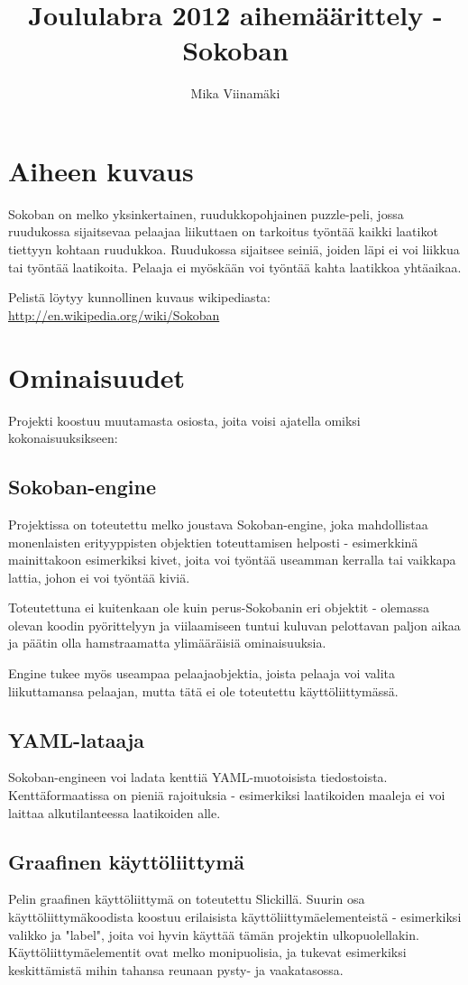 \documentclass{article}
\begin{document}
\title{Joululabra 2012 aihemäärittely - Sokoban}
\author{Mika Viinamäki}
\maketitle

\section*{Aiheen kuvaus}
Sokoban on melko yksinkertainen, ruudukkopohjainen puzzle-peli, jossa ruudukossa sijaitsevaa pelaajaa liikuttaen on tarkoitus työntää kaikki laatikot tiettyyn kohtaan ruudukkoa. Ruudukossa sijaitsee seiniä, joiden läpi ei voi liikkua tai työntää laatikoita. Pelaaja ei myöskään voi työntää kahta laatikkoa yhtäaikaa.
    
Pelistä löytyy kunnollinen kuvaus wikipediasta: \url{http://en.wikipedia.org/wiki/Sokoban}
    
\section*{Ominaisuudet}
Projekti koostuu muutamasta osiosta, joita voisi ajatella omiksi kokonaisuuksikseen:

\subsection*{Sokoban-engine}
Projektissa on toteutettu melko joustava Sokoban-engine, joka mahdollistaa monenlaisten erityyppisten objektien toteuttamisen helposti - esimerkkinä mainittakoon esimerkiksi kivet, joita voi työntää useamman kerralla tai vaikkapa lattia, johon ei voi työntää kiviä.

Toteutettuna ei kuitenkaan ole kuin perus-Sokobanin eri objektit - olemassa olevan koodin pyörittelyyn ja viilaamiseen tuntui kuluvan pelottavan paljon aikaa ja päätin olla hamstraamatta ylimääräisiä ominaisuuksia.

Engine tukee myös useampaa pelaajaobjektia, joista pelaaja voi valita liikuttamansa pelaajan, mutta tätä ei ole toteutettu käyttöliittymässä.

\subsection*{YAML-lataaja}
Sokoban-engineen voi ladata kenttiä YAML-muotoisista tiedostoista. Kenttäformaatissa on pieniä rajoituksia - esimerkiksi laatikoiden maaleja ei voi laittaa alkutilanteessa laatikoiden alle.

\subsection*{Graafinen käyttöliittymä}
Pelin graafinen käyttöliittymä on toteutettu Slickillä. Suurin osa käyttöliittymäkoodista koostuu erilaisista käyttöliittymäelementeistä - esimerkiksi valikko ja "label", joita voi hyvin käyttää tämän projektin ulkopuolellakin. Käyttöliittymäelementit ovat melko monipuolisia, ja tukevat esimerkiksi keskittämistä mihin tahansa reunaan pysty- ja vaakatasossa.
\end{document}
